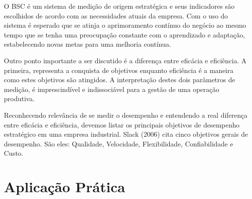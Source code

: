 O BSC é um sistema de medição de origem estratégica e seus indicadores são escolhidos de acordo com as necessidades atuais da empresa. Com o uso do sistema é esperado que se atinja o aprimoramento contínuo do negócio ao mesmo tempo que se tenha uma preocupação constante com o aprendizado e adaptação, estabelecendo novas metas para uma melhoria contínua.

Outro ponto importante a ser discutido é a diferença entre eficácia e eficiência. A primeira, representa a conquista de objetivos enquanto eficiência é a maneira como estes objetivos são atingidos. A interpretação destes dois parâmetros de medição, é imprescindível e indissociável para a gestão de uma operação produtiva.

Reconhecendo relevância de se medir o desempenho e entendendo a real diferença entre eficácia e eficiência, devemos listar os principais objetivos de desempenho estratégico em uma empresa industrial. Slack (2006) cita cinco objetivos gerais de desempenho. São eles: Qualidade, Velocidade, Flexibilidade, Confiabilidade e Custo. 

\section{Aplicação Prática} 
\label{sec:estrategia_da_producao_aplicacao}


